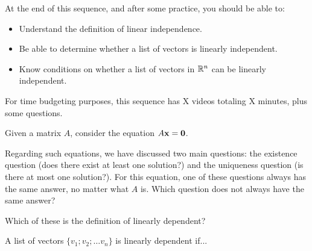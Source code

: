 







At the end of this sequence, and after some practice, you should be able to:

\begin{itemize}
\item Understand the definition of linear independence.  
\item Be able to determine whether a list of vectors is linearly independent. 
\item Know conditions on whether a list of vectors in $\mathbb R^n$ can be linearly independent.
\end{itemize}


For time budgeting purposes, this sequence has X videos totaling X minutes, 
plus some questions.  




\endedxtext

\endedxvertical





Given a matrix $A$, consider the equation $A\mathbf{x} = \mathbf{0}$.   

Regarding such equations, we have discussed two main questions: the existence question
(does there exist at least one solution?) and the uniqueness question (is there at most one
solution?).  For this equation, one of these questions always has the same answer, no matter
what $A$ is.  Which question does not always have the same answer?  


\edXsolution{  }

\endedxproblem





Which of these is the definition of linearly dependent?  

A list of vectors $\{v_1; v_2; \ldots v_n\}$ is linearly dependent if...


